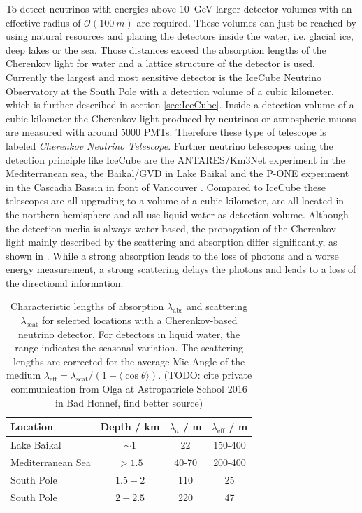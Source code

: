 To detect neutrinos with energies above \SI{10}{GeV} larger detector volumes with an effective radius of $\mathcal{O}(\SI{100}{m})$ are required.
These volumes can just be reached by using natural resources and placing the detectors inside the water, i.e. glacial ice, deep lakes or the sea.
Those distances exceed the absorption lengths of the Cherenkov light for water and a lattice structure of the detector is used.
Currently the largest and most sensitive detector is the IceCube Neutrino Observatory at the South Pole with a detection volume of a cubic kilometer, which is further described in section \ref{sec:IceCube}.
Inside a detection volume of a cubic kilometer the Cherenkov light produced by neutrinos or atmospheric muons are measured with around 5000 PMTs.
Therefore these type of telescope is labeled \textit{Cherenkov Neutrino Telescope}.
Further neutrino telescopes using the detection principle like IceCube are the ANTARES/Km3Net \cite{ANTARES11, KM3Net16} experiment in the Mediterranean sea, the Baikal/GVD in Lake Baikal \cite{Baikal97, GVD19} and the P-ONE experiment in the Cascadia Bassin in front of Vancouver \cite{PONE20}.
Compared to IceCube these telescopes are all upgrading to a volume of a cubic kilometer, are all located in the northern hemisphere and all use liquid water as detection volume.
Although the detection media is always water-based, the propagation of the Cherenkov light mainly described by the scattering and absorption differ significantly, as shown in .
While a strong absorption leads to the loss of photons and a worse energy measurement, a strong scattering delays the photons and leads to a loss of the directional information.
\begin{table}
    \caption{Characteristic lengths of absorption $\lambda_{\text{abs}}$ and scattering $\lambda_{\text{scat}}$ for selected locations with a Cherenkov-based neutrino detector. For detectors in liquid water, the range indicates the seasonal variation. The scattering lengths are corrected for the average Mie-Angle of the medium $\lambda_{\text{eff}}=\lambda_{\text{scat}}/(1-\langle\cos \theta\rangle)$. (TODO: cite private communication from Olga at Astropatricle School 2016 in Bad Honnef, find better source)}
    \label{tab:len_abs_scat}
    \begin{center}
    \begin{tabular}{l c c c}
        \toprule
        Location & Depth / km & $\lambda_a$ / m & $\lambda_{\text{eff}}$ / m \\
        \midrule
        Lake Baikal & $\sim 1$ & 22 & 150-400 \\
        Mediterranean Sea & $> 1.5$ & 40-70 & 200-400 \\
        South Pole & $1.5 - 2$ & 110 & 25 \\
        South Pole & $2 - 2.5$ & 220 & 47 \\
        \bottomrule
    \end{tabular}
    \end{center}
\end{table}

